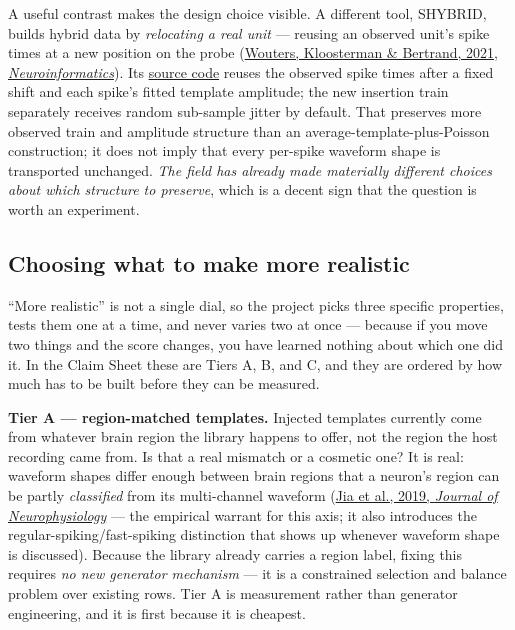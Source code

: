 \documentclass[12pt]{article}
\begin{document}
A useful contrast makes the design choice visible. A different tool, SHYBRID, builds hybrid
data by \emph{relocating a real unit} --- reusing an observed unit's spike times at a new
position on the probe
(\href{https://doi.org/10.1007/s12021-020-09474-8}{Wouters, Kloosterman \& Bertrand, 2021,
\emph{Neuroinformatics}}). Its
\href{https://github.com/jwouters91/shybrid/blob/master/hybridizer/threads.py}{source code}
reuses the observed spike times after a fixed shift and each spike's fitted template amplitude;
the new insertion train separately receives random sub-sample jitter by default. That preserves
more observed train and amplitude structure than an average-template-plus-Poisson construction;
it does not imply that every per-spike waveform shape is transported unchanged. \emph{The
field has already made materially different choices about which structure to preserve},
which is a decent sign that the question is worth an experiment.

\subsection{Choosing what to make more realistic}

``More realistic'' is not a single dial, so the project picks three specific properties,
tests them one at a time, and never varies two at once --- because if you move two things and
the score changes, you have learned nothing about which one did it. In the Claim Sheet these
are Tiers A, B, and C, and they are ordered by how much has to be built before they can be
measured.

\textbf{Tier A --- region-matched templates.} Injected templates currently come from whatever
brain region the library happens to offer, not the region the host recording came from. Is
that a real mismatch or a cosmetic one? It is real: waveform shapes differ enough between
brain regions that a neuron's region can be partly \emph{classified} from its multi-channel
waveform (\href{https://doi.org/10.1152/jn.00680.2018}{Jia et al., 2019, \emph{Journal of
Neurophysiology}} --- the empirical warrant for this axis; it also introduces the
regular-spiking/fast-spiking distinction that shows up whenever waveform shape is discussed).
Because the library already carries a region label, fixing this requires \emph{no new
generator mechanism} --- it is a constrained selection and balance problem over existing
rows. Tier A is measurement rather than generator engineering, and it is first because it is
cheapest.
\end{document}

